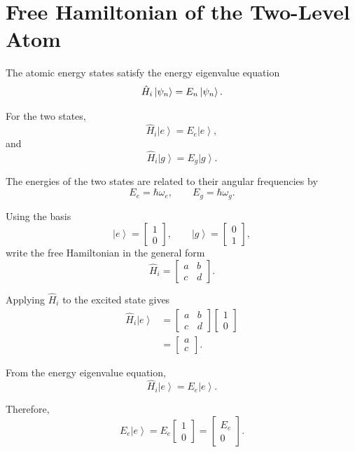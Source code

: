 \documentclass[12pt,a4paper]{article}
\newcommand{\ketg}{\left|g\right\rangle}
\newcommand{\kete}{\left|e\right\rangle}
\begin{document}
\section{Free Hamiltonian of the Two-Level Atom}

The atomic energy states satisfy the energy eigenvalue equation
\[
\hat H_i\ket{\psi_n}
=
E_n\ket{\psi_n}.
\]

For the two states,
\[
\hat H_i\kete
=
E_e\kete,
\]
and
\[
\hat H_i\ketg
=
E_g\ketg.
\]

The energies of the two states are related to their angular
frequencies by
\[
E_e=\hbar\omega_e,
\qquad
E_g=\hbar\omega_g.
\]

Using the basis
\[
\kete=
\begin{bmatrix}
1\\
0
\end{bmatrix},
\qquad
\ketg=
\begin{bmatrix}
0\\
1
\end{bmatrix},
\]
write the free Hamiltonian in the general form
\[
\hat H_i
=
\begin{bmatrix}
a&b\\
c&d
\end{bmatrix}.
\]

Applying \(\hat H_i\) to the excited state gives
\[
\begin{aligned}
\hat H_i\kete
&=
\begin{bmatrix}
a&b\\
c&d
\end{bmatrix}
\begin{bmatrix}
1\\
0
\end{bmatrix}\\
&=
\begin{bmatrix}
a\\
c
\end{bmatrix}.
\end{aligned}
\]

From the energy eigenvalue equation,
\[
\hat H_i\kete
=
E_e\kete.
\]

Therefore,
\[
E_e\kete
=
E_e
\begin{bmatrix}
1\\
0
\end{bmatrix}
=
\begin{bmatrix}
E_e\\
0
\end{bmatrix}.
\]
\end{document}
